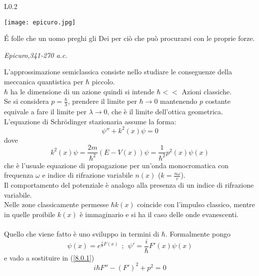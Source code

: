 \documentclass[twoside]{article}
\begin{document}
\begin{wrapfigure}[4]{L}{0.2\textwidth}
  \begin{center}
    \texttt{[image: epicuro.jpg]}
  \end{center}
\end{wrapfigure}\leavevmode

\vspace{9mm}
\epigraph{\'E folle che un uomo preghi gli Dei per ciò che può procurarsi con le proprie forze.}{\textit{Epicuro,341-270 a.c.}}
\vspace{9mm}

L'approssimazione semiclassica consiste nello studiare le conseguenze della meccanica quantistica per $\hbar$ piccolo.
\\
$\hbar$ ha le dimensione di un azione quindi si intende $\hbar <<$ Azioni classiche.
\\
Se si considera $p=\frac{h}{\lambda}$, prendere il limite per $\hbar \rightarrow 0$ mantenendo $p$ costante equivale a fare il limite per $\lambda \rightarrow 0$, che è il limite dell'ottica geometrica.
\\
L'equazione di Schr\"odinger stazionaria assume la forma:
\begin{equation} \label{8.0.1}
    \psi''+k^2(x)\psi=0
\end{equation}
dove
\begin{equation}
    k^2(x)\psi=\frac{2m}{\hbar^2}(E-V(x))\psi=\frac{1}{\hbar^2}p^2(x)\psi(x)
\end{equation}
che  è l'usuale equazione di propagazione per un'onda monocromatica con frequenza $\omega$ e indice di rifrazione variabile $n(x)$ ($k=\frac{n\omega}{c}$).
\\
Il comportamento del potenziale è analogo alla presenza di un indice di rifrazione variabile.
\\
Nelle zone classicamente permesse $\hbar k(x)$ coincide con l'impulso classico, mentre in quelle proibile $k(x)$ è immaginario e si ha il caso delle onde evanescenti.
\\
\\
Quello che viene fatto è uno sviluppo in termini di $\hbar$.
Formalmente pongo 
\begin{equation}
    \psi(x)=e^{\frac{i}{\hbar}F(x)} \ \ ; \ \ \psi'=\frac{i}{\hbar}F'(x)\psi(x)
\end{equation}
e vado a sostituire in (\ref{8.0.1})
\begin{equation}
    i\hbar F''-(F')^2 +p^2=0
\end{equation}
\end{document}
